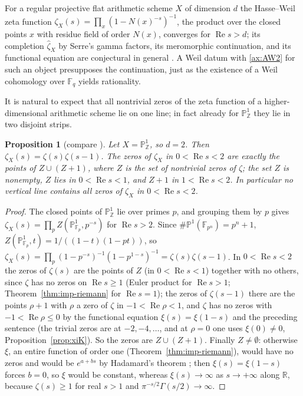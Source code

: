 \documentclass[11pt]{amsart}
\theoremstyle{plain}
\newtheorem{proposition}[theorem]{Proposition}
\theoremstyle{definition}
\theoremstyle{remark}
\numberwithin{equation}{section}
\newcommand{\R}{\mathbb{R}}
\newcommand{\Z}{\mathbb{Z}}
\newcommand{\F}{\mathbb{F}}
\DeclareMathOperator{\Rea}{Re}
\renewcommand{\Re}{\Rea}
\begin{document}
For a regular projective flat arithmetic scheme $X$ of dimension $d$
the Hasse--Weil zeta function
$\zeta_X(s)=\prod_x(1-N(x)^{-s})^{-1}$, the product over the closed
points $x$ with residue field of order $N(x)$, converges for $\Re s>d$;
its completion $\widehat\zeta_X$ by Serre's gamma factors, its
meromorphic continuation, and its functional equation are conjectural in
general \cite[Conjecture~1, p.~2]{Deninger2010HilbertPolya}. A Weil
datum with \ref{ax:AW2} for such an object presupposes the
continuation, just as the existence of a Weil cohomology over $\F_q$
yields rationality.

It is natural to expect that all nontrivial zeros of the zeta function
of a higher-dimensional arithmetic scheme lie on one line; in fact
already for $\mathbb{P}^1_\Z$ they lie in two disjoint strips.

\begin{proposition}[{compare \cite[Conjecture~1(c), p.~2]%
{Deninger2010HilbertPolya}}]\label{prop:P1Z}
Let $X=\mathbb{P}^1_\Z$, so $d=2$. Then $\zeta_X(s)=\zeta(s)\zeta(s-1)$.
The zeros of $\zeta_X$ in $0<\Re s<2$ are exactly the points of
$Z\cup(Z+1)$, where $Z$ is the set of nontrivial zeros of $\zeta$; the
set $Z$ is nonempty, $Z$ lies in $0<\Re s<1$, and $Z+1$ in $1<\Re s<2$.
In particular no vertical line contains all zeros of $\zeta_X$ in
$0<\Re s<2$.
\end{proposition}

\begin{proof}
The closed points of $\mathbb{P}^1_\Z$ lie over primes $p$, and grouping
them by $p$ gives $\zeta_X(s)=\prod_pZ(\mathbb{P}^1_{\F_p},p^{-s})$ for
$\Re s>2$. Since $\#\mathbb{P}^1(\F_{p^n})=p^n+1$,
$Z(\mathbb{P}^1_{\F_p},t)=1/((1-t)(1-pt))$, so
$\zeta_X(s)=\prod_p(1-p^{-s})^{-1}(1-p^{1-s})^{-1}=\zeta(s)\zeta(s-1)$.
In $0<\Re s<2$ the zeros of $\zeta(s)$ are the points of $Z$ (in
$0<\Re s<1$) together with no others, since $\zeta$ has no zeros on
$\Re s\ge1$ (Euler product for $\Re s>1$; Theorem~\ref{thm:imp-riemann}
for $\Re s=1$); the zeros of $\zeta(s-1)$ there are the points $\rho+1$
with $\rho$ a zero of $\zeta$ in $-1<\Re\rho<1$, and $\zeta$ has no zeros
with $-1<\Re\rho\le0$ by the functional equation $\xi(s)=\xi(1-s)$ and
the preceding sentence (the trivial zeros are at $-2,-4,\dots$, and at
$\rho=0$ one uses $\xi(0)\ne0$, Proposition~\ref{prop:xiK}). So the
zeros are $Z\cup(Z+1)$. Finally $Z\ne\emptyset$: otherwise $\xi$, an
entire function of order one (Theorem~\ref{thm:imp-riemann}), would have
no zeros and would be $e^{a+bs}$ by Hadamard's theorem
\cite[Theorem~1.4, p.~2]{Dupuy2017Hadamard}; then $\xi(s)=\xi(1-s)$
forces $b=0$, so $\xi$ would be constant, whereas $\xi(s)\to\infty$ as
$s\to+\infty$ along $\R$, because $\zeta(s)\ge1$ for real $s>1$ and
$\pi^{-s/2}\Gamma(s/2)\to\infty$.
\end{proof}
\end{document}
